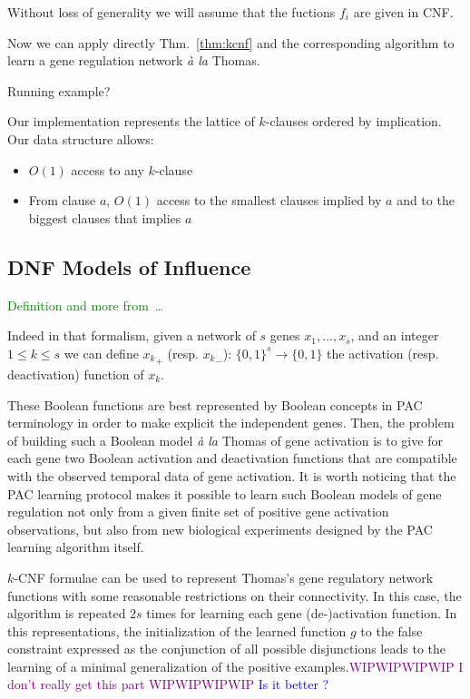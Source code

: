 \documentclass{llncs}
\newcommand{\wip}[1]{\textcolor{Purple}{WIPWIPWIPWIP #1 WIPWIPWIPWIP}}
\newcommand{\francois}[1]{\textcolor{blue}{#1}}
\newcommand{\sylvain}[1]{\textcolor{green}{#1}}
\begin{document}
Without loss of generality we will assume that the fuctions $f_i$ are given in
CNF.

Now we can apply directly Thm.~\ref{thm:kcnf} and the corresponding
algorithm to learn a gene regulation network \emph{\`a la} Thomas.

\begin{example}
   Running example?
\end{example}

Our implementation represents the lattice of $k$-clauses ordered by implication. Our data structure allows:
\begin{itemize}
	\item $O(1)$ access to any $k$-clause
	\item From clause $a$, $O(1)$ access to the smallest clauses implied by $a$ and to the biggest clauses that implies $a$
\end{itemize}

\subsection{DNF Models of Influence}

\sylvain{%
   Definition and more from~\cite{FMRS16cmsb}\dots
}

  Indeed in that formalism, given a network of $s$ genes $x_1,\ldots,x_s$, and an integer $1 \leq k \leq s$ we can define ${x_k}_+$ (resp. ${x_k}_-$): $\{0,1\}^s \rightarrow\{0,1\}$ the activation (resp. deactivation) function of $x_k$.

  These Boolean functions are best represented by Boolean concepts in PAC terminology
  in order to make explicit the independent genes.
  Then, the problem of building such a Boolean model \emph{\`a la} Thomas of gene activation is to give for each gene
  two Boolean activation and deactivation functions that are compatible with the observed temporal data of gene activation.
It is worth noticing that the PAC learning protocol makes it possible to learn such Boolean models of gene regulation
not only from a given finite set of positive gene activation observations,
but also from new biological experiments designed by the PAC learning algorithm itself.

$k$-CNF formulae can be used to represent Thomas's gene regulatory network functions with some reasonable restrictions on their connectivity.
In this case, the algorithm is repeated $2s$ times for learning each gene (de-)activation function.
In this representations, the initialization of the learned function $g$ to the false constraint expressed as the conjunction of all possible disjunctions
leads to the learning of a minimal generalization of the positive examples.\wip{I don't really get this part}
\francois{Is it better ?}
\end{document}
